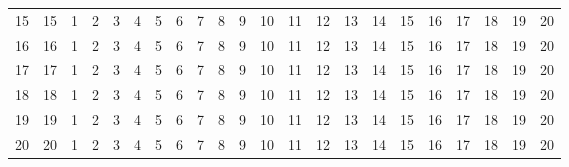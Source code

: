 \documentclass[10pt]{article}
\begin{document}
\begin{table}[ht]
\begin{tabular}{c|ccc|ccc|ccc|ccc|ccc|ccc|ccc}
    15 & 15 & 1 & 2 & 3 & 4 & 5 & 6 & 7 & 8 & 9 & 10 & 11 & 12 & 13 & 14 & 15 & 16 & 17 & 18 & 19 & 20\\
    16 & 16 & 1 & 2 & 3 & 4 & 5 & 6 & 7 & 8 & 9 & 10 & 11 & 12 & 13 & 14 & 15 & 16 & 17 & 18 & 19 & 20\\
    17 & 17 & 1 & 2 & 3 & 4 & 5 & 6 & 7 & 8 & 9 & 10 & 11 & 12 & 13 & 14 & 15 & 16 & 17 & 18 & 19 & 20\\

    \rowcolor{LightCyan}
    18 & 18 & 1 & 2 & 3 & 4 & 5 & 6 & 7 & 8 & 9 & 10 & 11 & 12 & 13 & 14 & 15 & 16 & 17 & 18 & 19 & 20\\
    \rowcolor{LightCyan}
    19 & 19 & 1 & 2 & 3 & 4 & 5 & 6 & 7 & 8 & 9 & 10 & 11 & 12 & 13 & 14 & 15 & 16 & 17 & 18 & 19 & 20\\
    \rowcolor{LightCyan}
    20 & 20 & 1 & 2 & 3 & 4 & 5 & 6 & 7 & 8 & 9 & 10 & 11 & 12 & 13 & 14 & 15 & 16 & 17 & 18 & 19 & 20\\

    \hline
  \end{tabular}
\end{table}
\end{document}
